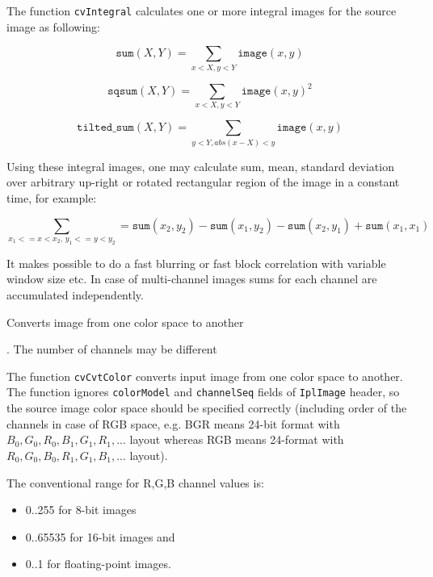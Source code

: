 The function \texttt{cvIntegral} calculates one or more integral images for the source image as following:

\[
\texttt{sum}(X,Y) = \sum_{x<X,y<Y} \texttt{image}(x,y)
\]

\[
\texttt{sqsum}(X,Y) = \sum_{x<X,y<Y} \texttt{image}(x,y)^2
\]

\[
\texttt{tilted\_sum}(X,Y) = \sum_{y<Y,abs(x-X)<y} \texttt{image}(x,y)
\]

Using these integral images, one may calculate sum, mean, standard deviation over arbitrary up-right or rotated rectangular region of the image in a constant time, for example:

\[
\sum_{x_1<=x<x_2, \, y_1<=y<y_2} = \texttt{sum}(x_2,y_2)-\texttt{sum}(x_1,y_2)-\texttt{sum}(x_2,y_1)+\texttt{sum}(x_1,x_1)
\]

It makes possible to do a fast blurring or fast block correlation with variable window size etc. In case of multi-channel images sums for each channel are accumulated independently.

\label{CvtColor}

Converts image from one color space to another


\begin{description}
. The number of channels may be different
\end{description}

The function \texttt{cvCvtColor} converts input image from one color
space to another. The function ignores \texttt{colorModel} and
\texttt{channelSeq} fields of \texttt{IplImage} header, so the
source image color space should be specified correctly (including
order of the channels in case of RGB space, e.g. BGR means 24-bit
format with $B_0, G_0, R_0, B_1, G_1, R_1, ...$ layout
whereas RGB means 24-format with $R_0, G_0, B_0, R_1, G_1, B_1, ...$
layout).

The conventional range for R,G,B channel values is:

\begin{itemize}
 \item 0..255 for 8-bit images
 \item 0..65535 for 16-bit images and
 \item 0..1 for floating-point images.
\end{itemize}

